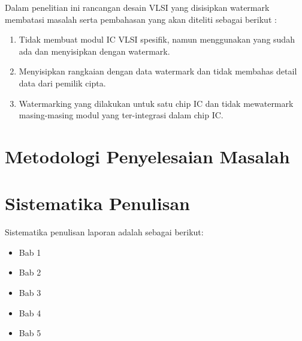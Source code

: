 Dalam penelitian ini rancangan desain VLSI yang disisipkan watermark
membatasi masalah serta pembahasan yang akan diteliti sebagai berikut :

\begin{enumerate}
	\item Tidak membuat modul IC VLSI spesifik, namun menggunakan yang
	sudah ada dan menyisipkan dengan watermark.
	
	\item Menyisipkan rangkaian dengan data watermark dan tidak membahas
	detail data dari pemilik cipta.
	
	\item Watermarking yang dilakukan untuk satu chip IC dan tidak mewatermark
	masing-masing modul yang ter-integrasi dalam chip IC. 
\end{enumerate}

\section{Metodologi Penyelesaian Masalah}


\section{Sistematika Penulisan}

Sistematika penulisan laporan adalah sebagai berikut:
\begin{itemize}
	\item Bab 1 \babSatu
	\item Bab 2 \babDua
	\item Bab 3 \babTiga
	\item Bab 4 \babEmpat
	\item Bab 5 \kesimpulan
\end{itemize}